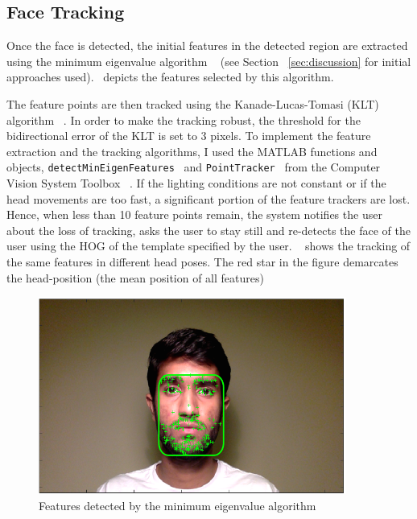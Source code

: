 \subsection{Face Tracking}

Once the face is detected, the initial features in the detected region are extracted using the minimum eigenvalue algorithm ~\cite{shi1994good} (see Section ~\ref{sec:discussion} for initial approaches used).~ depicts the features selected by this algorithm.

The feature points are then tracked using the Kanade-Lucas-Tomasi (KLT) algorithm ~\cite{tomasi1991detection}. In order to make the tracking robust, the threshold for the bidirectional error of the KLT is set to 3 pixels. To implement the feature extraction and the tracking algorithms, I used the MATLAB functions and objects, \texttt{detectMinEigenFeatures}~\cite{mineigen} and \texttt{PointTracker}~\cite{pointtracker} from the Computer Vision System Toolbox ~\cite{cvtoolbox}. If the lighting conditions are not constant or if the head movements are too fast, a significant portion of the feature trackers are lost. Hence, when less than 10 feature points remain, the system notifies the user about the loss of tracking, asks the user to stay still and re-detects the face of the user using the HOG of the template specified by the user. ~ shows the tracking of the same features in different head poses. The red star in the figure demarcates the head-position (the mean position of all features)

\begin{figure}[htbp]
	\begin{center}
		\includegraphics[width=0.9\textwidth]{pics/detectedFeatures.png}
	\end{center}%
	\caption{Features detected by the minimum eigenvalue algorithm}
	\label{fig:features}
\end{figure}%


